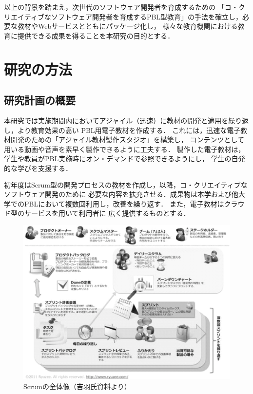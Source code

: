 \documentclass[a4j,9pt,twoside,twocolumn]{jsarticle}
\begin{document}
    以上の背景を踏まえ，次世代のソフトウェア開発者を育成するための
    「コ・クリエイティブなソフトウェア開発者を育成するPBL型教育」の手法を確立し，必要な教材やWebサービスとともにパッケージ化し，
    様々な教育機関における教育に提供できる成果を得ることを本研究の目的とする．

\section{研究の方法}
\subsection{研究計画の概要}
	本研究では実施期間内においてアジャイル（迅速）に教材の開発と適用を繰り返し，より教育効果の高い
	PBL用電子教材を作成する．
	これには，迅速な電子教材開発のための「アジャイル教材製作スタジオ」を構築し，
	コンテンツとして用いる動画や音声を素早く製作できるように工夫する．
	製作した電子教材は，学生や教員がPBL実施時にオン・デマンドで参照できるようにし，
	学生の自発的な学びを支援する．

	初年度はScrum型の開発プロセスの教材を作成し，以降，コ・クリエイティブなソフトウェア開発のために
	必要な内容を拡充させる．成果物は本学および他大学でのPBLにおいて複数回利用し，改善を繰り返す．
	また，電子教材はクラウド型のサービスを用いて利用者に
	広く提供するものとする．

\begin{figure}[h]
\begin{center}
\includegraphics[width=\linewidth]{figs/scrum.eps}
\caption{Scrumの全体像（吉羽氏資料より）}
\label{fig:scrum}
\end{center}
\end{figure}	
\end{document}
